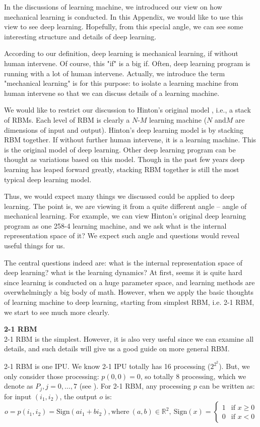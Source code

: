 In the discussions of learning machine, we introduced our view on how mechanical learning is conducted. In this Appendix, we would like to use this view to see deep learning. Hopefully, from this special angle, we can see some interesting structure and details of deep learning. 

According to our definition, deep learning is mechanical learning, if without human intervene. Of course, this "if" is a big if. Often, deep learning program is running with a lot of human intervene. Actually, we introduce the term "mechanical learning" is for this purpose: to isolate a learning machine from human intervene so that we can discuss details of a learning machine. 

We would like to restrict our discussion to Hinton's original model \cite{hinton}, i.e., a stack of RBMs. Each level of RBM is clearly a $N$-$M$ learning machine ($N$ and$M$ are dimensions of input and output). Hinton's deep learning model is by stacking RBM together. If without further human intervene, it is a learning machine. This is the original model of deep learning. Other deep learning program can be thought as variations based on this model. Though in the past few years deep learning has leaped forward greatly, stacking RBM together is still the most typical deep learning model.  

Thus, we would expect many things we discussed could be applied to deep learning. The point is, we are viewing it from a quite different angle -- angle of mechanical learning. For example, we can view Hinton's original deep learning program \cite{hinton} as one 258-4 learning machine, and we ask what is the internal representation space of it? We expect such angle and questions would reveal useful things for us.

The central questions indeed are: what is the internal representation space of deep learning? what is the learning dynamics? At first, seems it is quite hard since learning is conducted on a huge parameter space, and learning methods are overwhelmingly a big body of math. However, when we apply the basic thoughts of learning machine to deep learning, starting from simplest RBM, i.e. 2-1 RBM, we start to see much more clearly.
\bigskip


{\bf 2-1 RBM} \\
2-1 RBM is the simplest. However, it is also very useful since we can examine all details, and such details will give us a good guide on more general RBM. 

2-1 RBM is one IPU. We know 2-1 IPU totally has 16 processing ($2^{2^2}$). But, we only consider those processing: $p(0, 0) = 0$, so totally 8 processing, which we denote as $P_j, j=0, \ldots, 7$ (see \cite{paper1}). For 2-1 RBM, any processing $p$ can be written as: for input $(i_1, i_2)$, the output $o$ is:
$$
o = p(i_1, i_2) = \text{Sign}(a i_1 + b  i_2), \text{where} \ (a, b) \in \mathbb{R}^2, \ \text{Sign}(x) =
\left\{
	\begin{array}{ll}
		1  & \mbox{if } x \ge 0 \\
		0  & \mbox{if } x < 0
	\end{array}
\right.
$$

